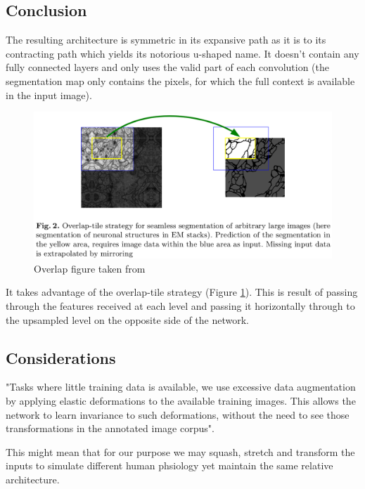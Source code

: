 \documentclass[11pt]{article}
\begin{document}
\subsection{Conclusion}

The resulting architecture is symmetric in its expansive path as it is to its contracting path which yields its notorious u-shaped name. It doesn't contain any fully connected layers and only uses the valid part of each convolution (the segmentation map only contains the pixels, for which the full context is available in the input image).

\begin{figure}[H]
    \centering
    \includegraphics[width=\linewidth]{images/overlap-tile.png}
    \caption{Overlap figure taken from \cite{U-Net}}
    \label{fig:overlap-tile}
\end{figure}

It takes advantage of the overlap-tile strategy (Figure \ref{fig:overlap-tile}). This is result of passing through the features received at each level and passing it horizontally through to the upsampled level on the opposite side of the network.

\subsection{Considerations}

"Tasks where little training data is available, we use excessive data augmentation by applying elastic deformations to the available training images. This allows the network to learn invariance to such deformations, without the need to see those transformations in the annotated image corpus".

This might mean that for our purpose we may squash, stretch and transform the inputs to simulate different human phsiology yet maintain the same relative architecture.
\end{document}
